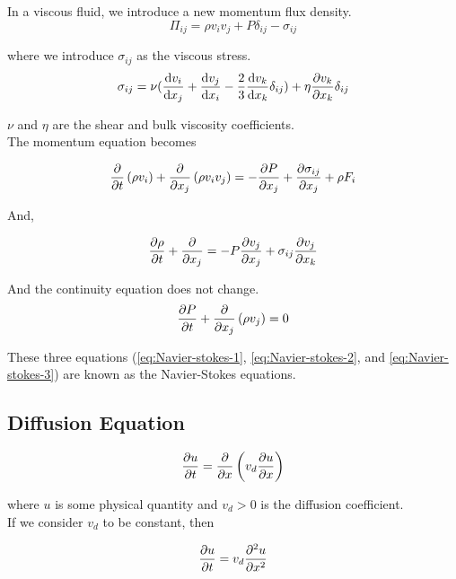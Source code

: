 \documentclass[]{article}
\begin{document}
In a viscous fluid, we introduce a new momentum flux density.\\

\[\Pi_{ij} = \rho v_i v_j + P\delta_{ij} - \sigma_{ij}\]

where we introduce $\sigma_{ij}$ as the viscous stress.\\

\[ \sigma_{ij} = \nu (\dv{v_i}{x_j} + \dv{v_j}{x_i} - \frac{2}{3}\dv{v_k}{x_k}\delta_{ij}) + \eta \pdv{v_k}{x_k}\delta_{ij}\]


$\nu$ and $\eta$ are the shear and bulk viscosity coefficients.\\

The momentum equation becomes 

\begin{equation}\label{eq:Navier-stokes-1}
	\pdv{}{t}\left(\rho v_i\right) + \pdv{}{x_j}\left(\rho v_iv_j\right) = -\pdv{P}{x_j} + \pdv{\sigma_{ij}}{x_j} + \rho F_i
\end{equation}

And,

\begin{equation}\label{eq:Navier-stokes-2}
	\pdv{\rho}{t} + \pdv{}{x_j}(\rho v_j) = -P \pdv{v_j}{x_j} + \sigma_{ij}\pdv{v_j}{x_k}
\end{equation}

And the continuity equation does not change.\\

\begin{equation}\label{eq:Navier-stokes-3}
	\pdv{P}{t} + \pdv{}{x_j}\left(\rho v_j\right) = 0
\end{equation}

These three equations (\ref{eq:Navier-stokes-1}, \ref{eq:Navier-stokes-2}, and \ref{eq:Navier-stokes-3}) are known as the Navier-Stokes equations.



\subsection{Diffusion Equation}\bigbreak

\[\pdv{u}{t} = \pdv{}{x} \left(v_d \pdv{u}{x}\right)\]

where $u$ is some physical quantity and $v_d > 0$ is the diffusion coefficient.\\

If we consider $v_d$ to be constant, then 

\[\pdv{u}{t} = v_d \pdv[2]{u}{x}\]
\end{document}
